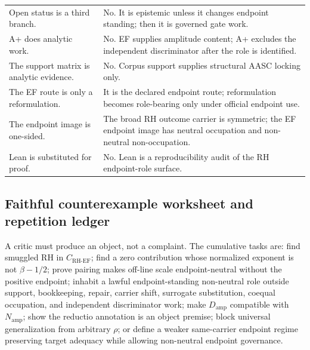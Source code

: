 \documentclass[11pt]{article}
\newcommand{\CRHEF}{C_{\mathrm{RH}\text{-}\mathrm{EF}}}
\newcommand{\Damp}{D_{\mathrm{amp}}}
\newcommand{\Namp}{N_{\mathrm{amp}}}
\begin{document}
\begin{longtable}{L{0.33\textwidth}L{0.57\textwidth}}
Open status is a third branch. & No.  It is epistemic unless it changes endpoint standing; then it is governed gate work.\\
A+ does analytic work. & No.  EF supplies amplitude content; A+ excludes the independent discriminator after the role is identified.\\
The support matrix is analytic evidence. & No.  Corpus support supplies structural AASC locking only.\\
The EF route is only a reformulation. & It is the declared endpoint route; reformulation becomes role-bearing only under official endpoint use.\\
The endpoint image is one-sided. & The broad RH outcome carrier is symmetric; the EF endpoint image has neutral occupation and non-neutral non-occupation.\\
Lean is substituted for proof. & No.  Lean is a reproducibility audit of the RH endpoint-role surface.\\
\bottomrule
\end{longtable}
\endgroup

\subsection{Faithful counterexample worksheet and repetition ledger}

A critic must produce an object, not a complaint.  The cumulative tasks are: find smuggled RH in \(\CRHEF\); find a zero contribution whose normalized exponent is not \(\beta-1/2\); prove pairing makes off-line scale endpoint-neutral without the positive endpoint; inhabit a lawful endpoint-standing non-neutral role outside support, bookkeeping, repair, carrier shift, surrogate substitution, coequal occupation, and independent discriminator work; make \(\Damp\) compatible with \(\Namp\); show the reductio annotation is an object premise; block universal generalization from arbitrary \(\rho\); or define a weaker same-carrier endpoint regime preserving target adequacy while allowing non-neutral endpoint governance.
\end{document}
